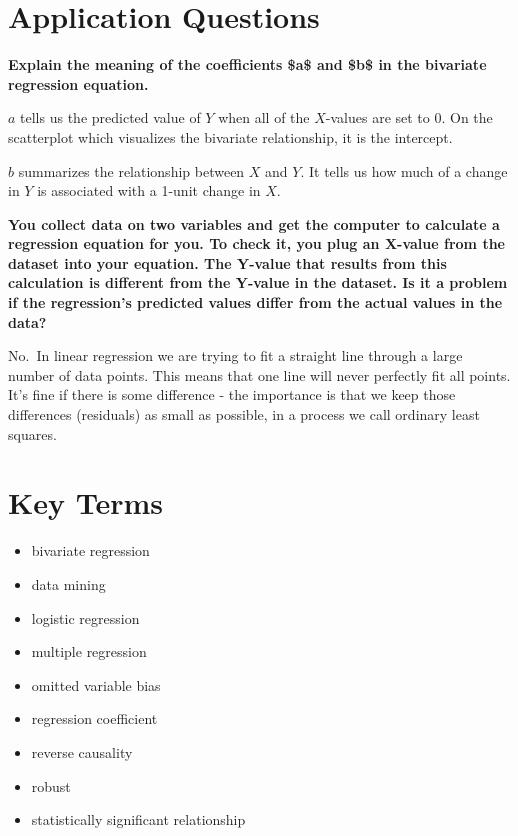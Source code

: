 \documentclass{book}
\newenvironment{shaded*}{
    \begin{center}
    \begin{tabular}{|p{0.9\textwidth}|}
    \hline\\
    }
    { 
    \\\\\hline
    \end{tabular} 
    \end{center}
}
\begin{document}
\hypertarget{application-questions-6}{%
\section{Application Questions}\label{application-questions-6}}

\textbf{Explain the meaning of the coefficients \$a\$ and \$b\$ in the bivariate regression equation.}

\begin{shaded*}

\(a\) tells us the predicted value of \(Y\) when all of the \(X\)-values are
set to 0. On the scatterplot which visualizes the bivariate relationship, it
is the intercept.

\(b\) summarizes the relationship between \(X\) and \(Y\). It tells us how
much of a change in \(Y\) is associated with a 1-unit change in \(X\).

\end{shaded*}

\textbf{You collect data on two variables and get the computer to calculate a regression equation for you. To check it, you plug an X-value from the dataset into your equation. The Y-value that results from this calculation is different from the Y-value in the dataset. Is it a problem if the regression's predicted values differ from the actual values in the data?}

\begin{shaded*}

No.~In linear regression we are trying to fit a straight line through a large
number of data points. This means that one line will never perfectly fit all
points. It's fine if there is some difference - the importance is that we keep
those differences (residuals) as small as possible, in a process we call
ordinary least squares.

\end{shaded*}

\hypertarget{key-terms-5}{%
\section{Key Terms}\label{key-terms-5}}

\begin{itemize}
\item
  bivariate regression
\item
  data mining
\item
  logistic regression
\item
  multiple regression
\item
  omitted variable bias
\item
  regression coefficient
\item
  reverse causality
\item
  robust
\item
  statistically significant relationship
\end{itemize}
\end{document}
